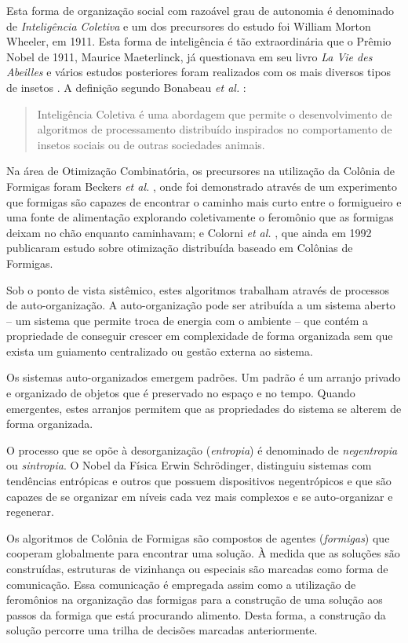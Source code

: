 Esta forma de organização social com razoável grau de autonomia é denominado de \emph{Inteligência Coletiva} e um dos precursores do estudo foi William Morton Wheeler, em 1911. Esta forma de inteligência é tão extraordinária que o Prêmio Nobel de 1911, Maurice Maeterlinck, já questionava em seu livro \emph{La Vie des Abeilles} e vários estudos posteriores foram realizados com os mais diversos tipos de insetos \cite{Dorigo2010}. A definição segundo Bonabeau \emph{et al.} \cite{bonabeau1999swarm}:

\begin{quote}
Inteligência Coletiva é uma abordagem que permite o desenvolvimento de algoritmos de processamento distribuído inspirados no comportamento de insetos sociais ou de outras sociedades animais.
\end{quote}

Na área de Otimização Combinatória, os precursores na utilização da Colônia de Formigas foram Beckers \emph{et al.} \cite{Beckers1992TrailsAU}, onde foi demonstrado através de um experimento que formigas são capazes de encontrar o caminho mais curto entre o formigueiro e uma fonte de alimentação explorando coletivamente o feromônio que as formigas deixam no chão enquanto caminhavam; e Colorni \emph{et al.} \cite{colorni1992distributed}, que ainda em 1992 publicaram estudo sobre otimização distribuída baseado em Colônias de Formigas.

Sob o ponto de vista sistêmico, estes algoritmos trabalham através de processos de auto-organização. A auto-organização pode ser atribuída a um sistema aberto -- um sistema que permite troca de energia com o ambiente -- que contém a propriedade de conseguir crescer em complexidade de forma organizada sem que exista um guiamento centralizado ou gestão externa ao sistema.

Os sistemas auto-organizados emergem padrões. Um padrão é um arranjo privado e organizado de objetos que é preservado no espaço e no tempo. Quando emergentes, estes arranjos permitem que as propriedades do sistema se alterem de forma organizada.

O processo que se opõe à desorganização (\emph{entropia}) é denominado de \emph{negentropia} ou \emph{sintropia}. O Nobel da Física Erwin Schrödinger, distinguiu sistemas com tendências entrópicas e outros que possuem dispositivos negentrópicos e que são capazes de se organizar em níveis cada vez mais complexos e se auto-organizar e regenerar. 

Os algoritmos de Colônia de Formigas são compostos de agentes (\emph{formigas}) que cooperam globalmente para encontrar uma solução. À medida que as soluções são construídas, estruturas de vizinhança ou especiais são marcadas como forma de comunicação. Essa comunicação é empregada assim como a utilização de feromônios na organização das formigas para a construção de uma solução aos passos da formiga que está procurando alimento. Desta forma, a construção da solução percorre uma trilha de decisões marcadas anteriormente.

